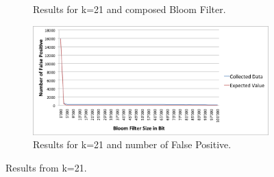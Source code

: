 \documentclass[12]{scrartcl}
\begin{document}
\begin{figure}[H]
\begin{subfigure}[t]{\textwidth}
\begin{center}
		\end{center}
		\caption{Results for k=21 and composed Bloom Filter.}
	\end{subfigure}
	\begin{subfigure}[t]{\textwidth}
		\begin{center}
			\includegraphics[scale=0.3]{res/21-fp.png}
		\end{center}
		\caption{Results for k=21 and number of False Positive.}
	\end{subfigure}
	\caption{Results from k=21.}
\end{figure}
\end{document}
